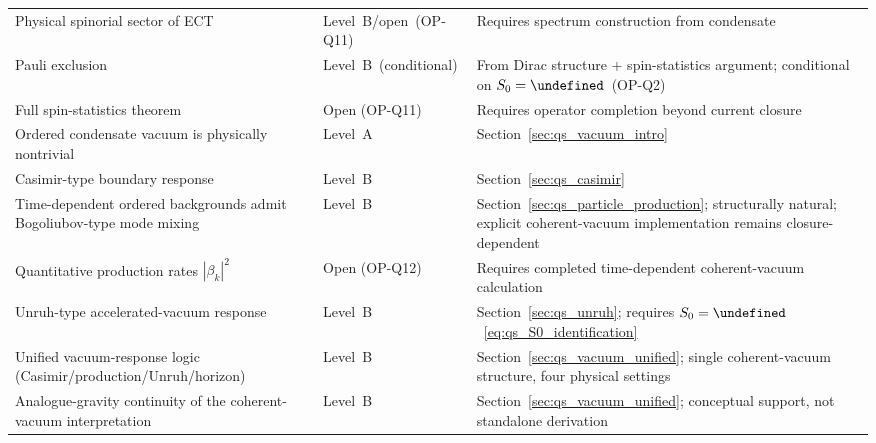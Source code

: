 \documentclass[11pt,a4paper]{article}
\let\hbar\undefined
\numberwithin{equation}{section}
\begin{document}
{\begin{longtable}{p{6.0cm}p{2.4cm}p{4.5cm}}
Physical spinorial sector of ECT
  & Level~B/open~(OP-Q11)
  & Requires spectrum construction from condensate \\
Pauli exclusion
  & Level~B~(conditional)
  & From Dirac structure + spin-statistics argument;
    conditional on $S_0=\hbar$~(OP-Q2) \\
Full spin-statistics theorem
  & Open (OP-Q11)
  & Requires operator completion beyond current closure \\
Ordered condensate vacuum is physically nontrivial
  & Level~A
  & Section~\ref{sec:qs_vacuum_intro} \\
Casimir-type boundary response
  & Level~B
  & Section~\ref{sec:qs_casimir} \\
Time-dependent ordered backgrounds admit Bogoliubov-type mode mixing
  & Level~B
  & Section~\ref{sec:qs_particle_production};
    structurally natural; explicit coherent-vacuum implementation
    remains closure-dependent \\
Quantitative production rates $|\beta_k|^2$
  & Open (OP-Q12)
  & Requires completed time-dependent coherent-vacuum calculation \\
Unruh-type accelerated-vacuum response
  & Level~B
  & Section~\ref{sec:qs_unruh}; requires $S_0=\hbar$~\eqref{eq:qs_S0_identification} \\
Unified vacuum-response logic (Casimir/production/Unruh/horizon)
  & Level~B
  & Section~\ref{sec:qs_vacuum_unified};
    single coherent-vacuum structure, four physical settings \\
Analogue-gravity continuity of the coherent-vacuum interpretation
  & Level~B
  & Section~\ref{sec:qs_vacuum_unified};
    conceptual support, not standalone derivation \\
\end{longtable}
}
\end{document}
